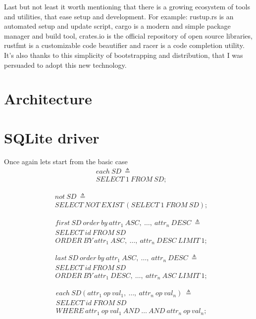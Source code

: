 Last but not least it worth mentioning that there is a growing ecosystem of tools and utilities, that ease setup and development. For example: rustup.rs is an automated setup and update script, cargo is a modern and simple package manager and build tool, crates.io is the official repository of open source libraries, rustfmt is a customizable code beautifier and racer is a code completion utility. It's also thanks to this simplicity of bootstrapping and distribution, that I was persuaded to adopt this new technology.

\section{Architecture}

\section{SQLite driver}
Once again lets start from the basic case
\begin{align*}%
&each\ SD\ \triangleq\\
&SELECT\ 1\ FROM\ SD;
\end{align*}

\begin{align*}%
&not\ SD\ \triangleq\\
&SELECT\ NOT\ EXIST\ (SELECT\ 1\ FROM\ SD);
\end{align*}

\begin{align*}%
&first\ SD\ order\ by\ attr_1\ ASC,\ \ldots,\ attr_n\ DESC\ \triangleq\\
&SELECT\ id\ FROM\ SD\\
&ORDER\ BY\ attr_1\ ASC,\ \ldots,\ attr_n\ DESC\ LIMIT\ 1;
\end{align*}

\begin{align*}%
&last\ SD\ order\ by\ attr_1\ ASC,\ \ldots,\ attr_n\ DESC\ \triangleq\\
&SELECT\ id\ FROM\ SD\\
&ORDER\ BY\ attr_1\ DESC,\ \ldots,\ attr_n\ ASC\ LIMIT\ 1;
\end{align*}

\begin{align*}%
&each\ SD(attr_1\ op \ val_1,\ \ldots,\ attr_n\ op \ val_n)\ \triangleq\\
&SELECT\ id\ FROM\ SD\\
&WHERE\ attr_1\ op\ val_1\ AND\ \ldots\ AND\ attr_n\ op\ val_n;
\end{align*}

